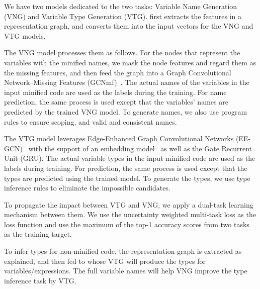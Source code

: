 We have two models dedicated to the two tasks: Variable Name
Generation (VNG) and Variable Type Generation (VTG). {\tool}
first extracts the features in a representation graph,
and converts them into the input vectors for the VNG and VTG models.

The VNG model processes them as follows.
For the nodes that represent the variables with the minified names, we
mask the node features and regard them as the missing features, and
then feed the graph into a Graph Convolutional
Network--Missing Features (GCNmf)~\cite{GCNmf}. The actual names of
the variables in the input minified code are used as the labels during
the training. For name prediction, the same
process is used except that the variables' names are predicted
by the trained VNG model. To generate names, we also use program
 rules to ensure scoping, and valid and consistent names.

The VTG model leverages Edge-Enhanced Graph Convolutional Networks
(EE-GCN)~\cite{ee-gcn} with the support of an embedding
model~\cite{pennington2014glove} as well as the Gate Recurrent Unit
(GRU). The actual variable types in the input minified code
are used as the labels during training. For prediction, the same
process is used except that the types are predicted
using the trained model. To generate the types, we use type
inference rules to eliminate the impossible candidates.


To propagate the impact between VTG and VNG, we apply a dual-task
learning mechanism between them. We use the uncertainty weighted
multi-task loss as the loss function and use the
maximum of the top-1 accuracy scores from two tasks as the training
target.

To infer types for non-minified code, the representation graph is
extracted as explained, and then fed to {\tool} whose VTG will produce
the types for variables/expressions. The full variable names will help
VNG improve the type inference task by VTG.




